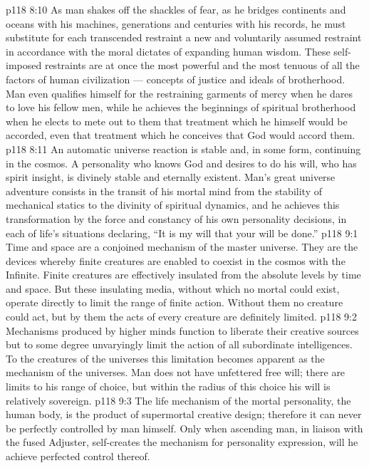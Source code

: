 \vs p118 8:10 As man shakes off the shackles of fear, as he bridges continents and oceans with his machines, generations and centuries with his records, he must substitute for each transcended restraint a new and voluntarily assumed restraint in accordance with the moral dictates of expanding human wisdom. These self\hyp{}imposed restraints are at once the most powerful and the most tenuous of all the factors of human civilization --- concepts of justice and ideals of brotherhood. Man even qualifies himself for the restraining garments of mercy when he dares to love his fellow men, while he achieves the beginnings of spiritual brotherhood when he elects to mete out to them that treatment which he himself would be accorded, even that treatment which he conceives that God would accord them.
\vs p118 8:11 An automatic universe reaction is stable and, in some form, continuing in the cosmos. A personality who knows God and desires to do his will, who has spirit insight, is divinely stable and eternally existent. Man’s great universe adventure consists in the transit of his mortal mind from the stability of mechanical statics to the divinity of spiritual dynamics, and he achieves this transformation by the force and constancy of his own personality decisions, in each of life’s situations declaring, “It is my will that your will be done.”
\vs p118 9:1 Time and space are a conjoined mechanism of the master universe. They are the devices whereby finite creatures are enabled to coexist in the cosmos with the Infinite. Finite creatures are effectively insulated from the absolute levels by time and space. But these insulating media, without which no mortal could exist, operate directly to limit the range of finite action. Without them no creature could act, but by them the acts of every creature are definitely limited.
\vs p118 9:2 Mechanisms produced by higher minds function to liberate their creative sources but to some degree unvaryingly limit the action of all subordinate intelligences. To the creatures of the universes this limitation becomes apparent as the mechanism of the universes. Man does not have unfettered free will; there are limits to his range of choice, but within the radius of this choice his will is relatively sovereign.
\vs p118 9:3 The life mechanism of the mortal personality, the human body, is the product of supermortal creative design; therefore it can never be perfectly controlled by man himself. Only when ascending man, in liaison with the fused Adjuster, self\hyp{}creates the mechanism for personality expression, will he achieve perfected control thereof.
